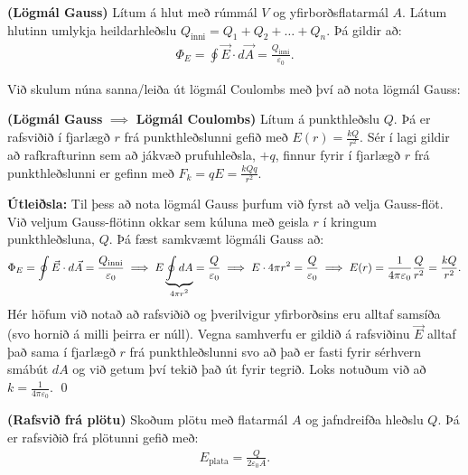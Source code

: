 \vspace{0.2cm}


\begin{tcolorbox}
\begin{theorem}
\textbf{(Lögmál Gauss)} Lítum á hlut með rúmmál $V$ og yfirborðsflatarmál $A$. Látum hlutinn umlykja heildarhleðslu $Q_{\text{inni}} = Q_1 + Q_2 + \ldots + Q_n$. Þá gildir að:
\begin{align*}
    \Phi_E = \oint \vec{E} \cdot d\vec{A} = \frac{Q_{\text{inni}}}{\varepsilon_0}.
\end{align*}
\end{theorem}
\end{tcolorbox}


Við skulum núna sanna/leiða út lögmál Coulombs með því að nota lögmál Gauss:

\begin{tcolorbox}
\begin{theorem}
\textbf{(Lögmál Gauss} $\mathbf{\implies}$ \textbf{Lögmál Coulombs)} Lítum á punkthleðslu $Q$. Þá er rafsviðið í fjarlægð $r$ frá punkthleðslunni gefið með $E(r) = \frac{kQ}{r^2}$. Sér í lagi gildir að rafkrafturinn sem að jákvæð prufuhleðsla, $+q$, finnur fyrir í fjarlægð $r$ frá punkthleðslunni er gefinn með $F_k = qE = \frac{kQq}{r^2}$.
\end{theorem}
\end{tcolorbox}

\textbf{Útleiðsla:} Til þess að nota lögmál Gauss þurfum við fyrst að velja Gauss-flöt. Við veljum Gauss-flötinn okkar sem kúluna með geisla $r$ í kringum punkthleðsluna, $Q$. Þá fæst samkvæmt lögmáli Gauss að:
\begin{align*}
    \Phi_E = \oint \vec{E} \cdot d\vec{A} = \frac{Q_{\text{inni}}}{\varepsilon_0} \implies E \underbrace{\oint dA}_\textrm{$4\pi r^2$} = \frac{Q}{\varepsilon_0} \implies E \cdot 4\pi r^2 = \frac{Q}{\varepsilon_0} \implies E(r) = \frac{1}{4\pi \varepsilon_0} \frac{Q}{r^2} = \frac{kQ}{r^2}.
\end{align*}
Hér höfum við notað að rafsviðið og þverilvigur yfirborðsins eru alltaf samsíða (svo hornið á milli þeirra er núll). Vegna samhverfu er gildið á rafsviðinu $\vec{E}$ alltaf það sama í fjarlægð $r$ frá punkthleðslunni svo að það er fasti fyrir sérhvern smábút $dA$ og við getum því tekið það út fyrir tegrið. Loks notuðum við að $k = \frac{1}{4\pi \varepsilon_0}$. \qed

\begin{tcolorbox}
\begin{theorem}
\textbf{(Rafsvið frá plötu)} Skoðum plötu með flatarmál $A$ og jafndreifða hleðslu $Q$. Þá er rafsviðið frá plötunni gefið með:
\begin{align*}
    E_{\text{plata}} = \frac{Q}{2\varepsilon_0 A}.
\end{align*}
\end{theorem}
\end{tcolorbox}


